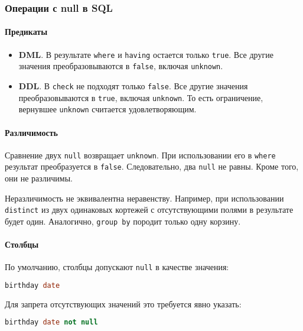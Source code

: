 \subsubsection{Операции с null в SQL}

\paragraph{Предикаты}

\begin{itemize}
	\item \textbf{DML}. В результате \texttt{where} и \texttt{having} остается только
	      \texttt{true}. Все другие значения преобразовываются в \texttt{false}, включая
	      \texttt{unknown}.
	\item \textbf{DDL}. В \texttt{check} не подходят только \texttt{false}. Все другие
	      значения преобразовываются в \texttt{true}, включая \texttt{unknown}. То есть
	      ограничение, вернувшее \texttt{unknown} считается удовлетворяющим.
\end{itemize}

\paragraph{Различимость}

Сравнение двух \texttt{null} возвращает \texttt{unknown}. При использовании его в
\texttt{where} результат преобразуется в \texttt{false}. Следовательно, два
\texttt{null} не равны. Кроме того, они не различимы.

Неразличимость не эквивалентна неравенству. Например, при использовании \texttt{distinct} из
двух одинаковых кортежей с отсутствующими полями в результате будет один. Аналогично,
\texttt{group by} породит только одну корзину.

\paragraph{Столбцы}

По умолчанию, столбцы допускают \texttt{null} в качестве значения:

\begin{lstlisting}[language=SQL]
    birthday date
\end{lstlisting}

Для запрета отсутствующих значений это требуется явно указать:

\begin{lstlisting}[language=SQL]
    birthday date not null
\end{lstlisting}

